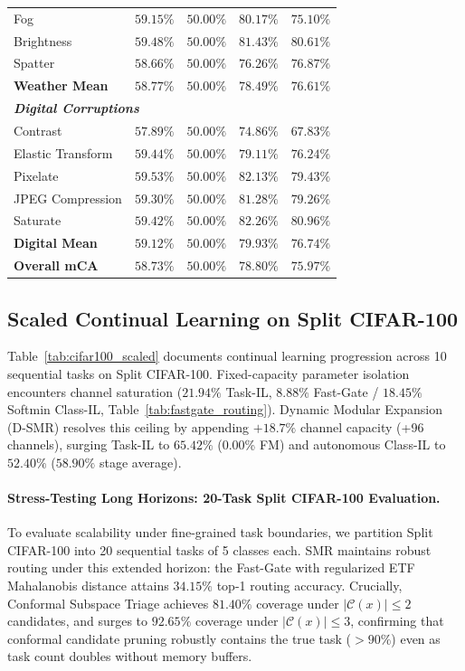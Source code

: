 \documentclass{article}
\begin{document}
\begin{table}[htbp]
{\begin{tabular}{lcccc}
\quad Fog & $59.15\%$ & $50.00\%$ & $80.17\%$ & $\mathbf{75.10\%}$ \\
\quad Brightness & $59.48\%$ & $50.00\%$ & $81.43\%$ & $\mathbf{80.61\%}$ \\
\quad Spatter & $58.66\%$ & $50.00\%$ & $76.26\%$ & $\mathbf{76.87\%}$ \\
\quad \textbf{Weather Mean} & $58.77\%$ & $50.00\%$ & $78.49\%$ & $\mathbf{76.61\%}$ \\
\midrule
\multicolumn{5}{l}{\textit{\textbf{Digital Corruptions}}} \\
\quad Contrast & $57.89\%$ & $50.00\%$ & $74.86\%$ & $\mathbf{67.83\%}$ \\
\quad Elastic Transform & $59.44\%$ & $50.00\%$ & $79.11\%$ & $\mathbf{76.24\%}$ \\
\quad Pixelate & $59.53\%$ & $50.00\%$ & $82.13\%$ & $\mathbf{79.43\%}$ \\
\quad JPEG Compression & $59.30\%$ & $50.00\%$ & $81.28\%$ & $\mathbf{79.26\%}$ \\
\quad Saturate & $59.42\%$ & $50.00\%$ & $82.26\%$ & $\mathbf{80.96\%}$ \\
\quad \textbf{Digital Mean} & $59.12\%$ & $50.00\%$ & $79.93\%$ & $\mathbf{76.74\%}$ \\
\midrule
\textbf{Overall mCA} & $\mathbf{58.73\%}$ & $\mathbf{50.00\%}$ & $\mathbf{78.80\%}$ & $\mathbf{75.97\%}$ \\
\bottomrule
\end{tabular}%
}
\end{table}

\subsection{Scaled Continual Learning on Split CIFAR-100}
\label{sec:app_cifar100}
\label{sec:asymptotic_storage}
Table~\ref{tab:cifar100_scaled} documents continual learning progression across 10 sequential tasks on Split CIFAR-100. Fixed-capacity parameter isolation encounters channel saturation ($21.94\%$ Task-IL, $8.88\%$ Fast-Gate / $18.45\%$ Softmin Class-IL, Table~\ref{tab:fastgate_routing}). Dynamic Modular Expansion (D-SMR) resolves this ceiling by appending $+18.7\%$ channel capacity (+96 channels), surging Task-IL to $\mathbf{65.42\%}$ (0.00\% FM) and autonomous Class-IL to $\mathbf{52.40\%}$ ($58.90\%$ stage average).

\paragraph{Stress-Testing Long Horizons: 20-Task Split CIFAR-100 Evaluation.}
To evaluate scalability under fine-grained task boundaries, we partition Split CIFAR-100 into 20 sequential tasks of 5 classes each. SMR maintains robust routing under this extended horizon: the Fast-Gate with regularized ETF Mahalanobis distance attains $34.15\%$ top-1 routing accuracy. Crucially, Conformal Subspace Triage achieves $81.40\%$ coverage under $|\mathcal{C}(x)| \le 2$ candidates, and surges to $\mathbf{92.65\%}$ coverage under $|\mathcal{C}(x)| \le 3$, confirming that conformal candidate pruning robustly contains the true task ($>90\%$) even as task count doubles without memory buffers.
\end{document}
